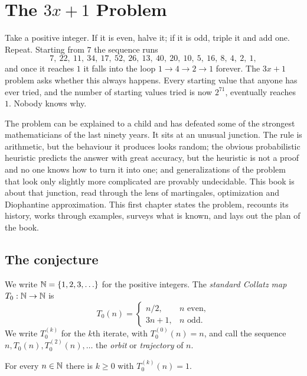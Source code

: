 \chapter{The $3x+1$ Problem}\label{chap:intro}

Take a positive integer. If it is even, halve it; if it is odd, triple it and
add one. Repeat. Starting from $7$ the sequence runs
\[
  7,\ 22,\ 11,\ 34,\ 17,\ 52,\ 26,\ 13,\ 40,\ 20,\ 10,\ 5,\ 16,\ 8,\ 4,\ 2,\ 1,
\]
and once it reaches $1$ it falls into the loop $1\to4\to2\to1$ forever. The
$3x+1$ problem asks whether this always happens. Every starting value that
anyone has ever tried, and the number of starting values tried is now
$2^{71}$, eventually reaches $1$. Nobody knows why.

The problem can be explained to a child and has defeated some of the strongest
mathematicians of the last ninety years. It sits at an unusual junction. The
rule is arithmetic, but the behaviour it produces looks random; the obvious
probabilistic heuristic predicts the answer with great accuracy, but the
heuristic is not a proof and no one knows how to turn it into one; and
generalizations of the problem that look only slightly more complicated are
provably undecidable. This book is about that junction, read through the lens
of martingales, optimization and Diophantine approximation. This first chapter
states the problem, recounts its history, works through examples, surveys what
is known, and lays out the plan of the book.

\section{The conjecture}\label{sec:ch1:conjecture}

We write $\mathbb{N}=\{1,2,3,\ldots\}$ for the positive integers. The \emph{standard
Collatz map} $T_0:\mathbb{N}\to\mathbb{N}$ is
\begin{equation}\label{eq:ch1:T0}
  T_0(n)=\begin{cases} n/2, & n \text{ even},\\ 3n+1, & n \text{ odd}.\end{cases}
\end{equation}
We write $T_0^{(k)}$ for the $k$th iterate, with $T_0^{(0)}(n)=n$, and call the
sequence $n, T_0(n), T_0^{(2)}(n),\ldots$ the \emph{orbit} or
\emph{trajectory} of $n$.

\begin{conjecture}\label{conj:ch1:collatz}
For every $n\in\mathbb{N}$ there is $k\geq0$ with $T_0^{(k)}(n)=1$.
\end{conjecture}

